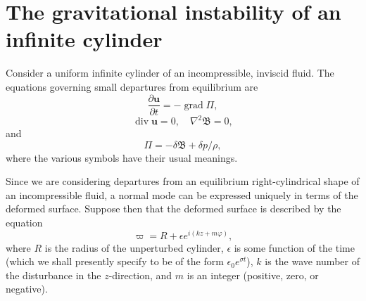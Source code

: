 \section{The gravitational instability of an infinite cylinder}\label{sec:108}
Consider a uniform infinite cylinder of an incompressible, inviscid fluid. The equations governing small departures from equilibrium are
\begin{equation}
\label{eq:12-2}
\frac{\partial \mathbf{u}}{\partial t} = -\operatorname{grad} \Pi,
\end{equation}
\begin{equation}
\label{eq:12-3}
\operatorname{div} \mathbf{u} = 0, \quad \nabla^2 \mathfrak{B} = 0,
\end{equation}
and
\begin{equation}
\label{eq:12-4}
\Pi = -\delta\mathfrak{B} + \delta p / \rho,
\end{equation}
where the various symbols have their usual meanings.

Since we are considering departures from an equilibrium right-cylindrical shape of an incompressible fluid, a normal mode can be expressed uniquely in terms of the deformed surface. Suppose then that the deformed surface is described by the equation
\begin{equation}
\label{eq:12-5}
\varpi = R + \epsilon e^{i(kz + m\varphi)},
\end{equation}
where $R$ is the radius of the unperturbed cylinder, $\epsilon$ is some function of the time (which we shall presently specify to be of the form $\epsilon_0 e^{\sigma t}$), $k$ is the wave number of the disturbance in the $z$-direction, and $m$ is an integer (positive, zero, or negative).

